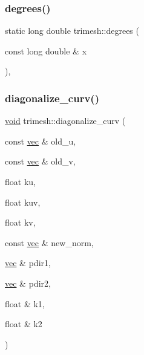 \mbox{\label{namespacetrimesh_a30acf3d700e46bf12b16c60a10efc12d}} 
\subsubsection{\texorpdfstring{degrees()}{degrees()}\hspace{0.1cm}{\footnotesize\ttfamily [3/3]}}
{\footnotesize\ttfamily static long double trimesh\+::degrees (\begin{DoxyParamCaption}\item[{const long double \&}]{x }\end{DoxyParamCaption})\hspace{0.3cm}{\ttfamily [inline]}, {\ttfamily [static]}}

\mbox{\label{namespacetrimesh_a598226133f56948e8f2b139a1eba4291}} 
\subsubsection{\texorpdfstring{diagonalize\+\_\+curv()}{diagonalize\_curv()}}
{\footnotesize\ttfamily \hyperlink{namespacetrimesh_a784ddfd979e1c579bda795a8edfc3f43}{void} trimesh\+::diagonalize\+\_\+curv (\begin{DoxyParamCaption}\item[{const \hyperlink{namespacetrimesh_a4fc2b83feba99c931f837a0c7d4b4df1}{vec} \&}]{old\+\_\+u,  }\item[{const \hyperlink{namespacetrimesh_a4fc2b83feba99c931f837a0c7d4b4df1}{vec} \&}]{old\+\_\+v,  }\item[{float}]{ku,  }\item[{float}]{kuv,  }\item[{float}]{kv,  }\item[{const \hyperlink{namespacetrimesh_a4fc2b83feba99c931f837a0c7d4b4df1}{vec} \&}]{new\+\_\+norm,  }\item[{\hyperlink{namespacetrimesh_a4fc2b83feba99c931f837a0c7d4b4df1}{vec} \&}]{pdir1,  }\item[{\hyperlink{namespacetrimesh_a4fc2b83feba99c931f837a0c7d4b4df1}{vec} \&}]{pdir2,  }\item[{float \&}]{k1,  }\item[{float \&}]{k2 }\end{DoxyParamCaption})}



